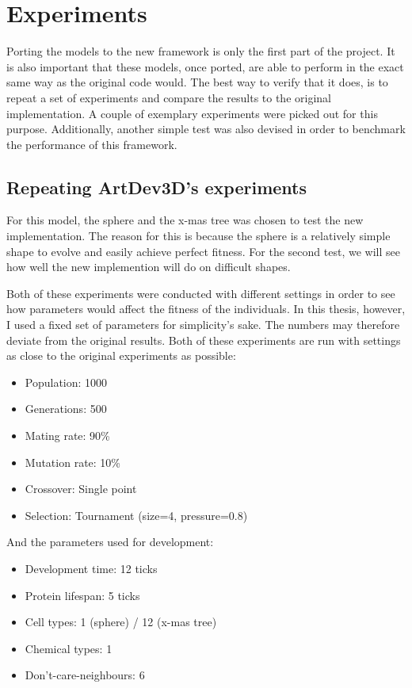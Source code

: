 \section{Experiments}
\label{sec:experiments}
Porting the models to the new framework is only the first part of the project. It is also important that these models, once ported, are able to perform in the exact same way as the original code would. The best way to verify that it does, is to repeat a set of experiments and compare the results to the original implementation. A couple of exemplary experiments were picked out for this purpose. Additionally, another simple test was also devised in order to benchmark the performance of this framework.

\subsection{Repeating ArtDev3D's experiments}
For this model, the sphere and the x-mas tree was chosen to test the new implementation. The reason for this is because the sphere is a relatively simple shape to evolve and easily achieve perfect fitness. For the second test, we will see how well the new implemention will do on difficult shapes.

Both of these experiments were conducted with different settings in order to see how parameters would affect the fitness of the individuals. In this thesis, however, I used a fixed set of parameters for simplicity's sake. The numbers may therefore deviate from the original results. Both of these experiments are run with settings as close to the original experiments as possible:

\begin{itemize}
	\itemsep=-2pt
	\item Population: 1000
	\item Generations: 500
	\item Mating rate: 90\%
	\item Mutation rate: 10\%
	\item Crossover: Single point
	\item Selection: Tournament (size=4, pressure=0.8)
\end{itemize}

And the parameters used for development:

\begin{itemize}
	\itemsep=-2pt
	\item Development time: 12 ticks
	\item Protein lifespan: 5 ticks
	\item Cell types: 1 (sphere) / 12 (x-mas tree)
	\item Chemical types: 1
	\item Don't-care-neighbours: 6
\end{itemize}

